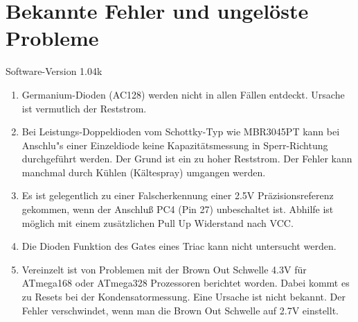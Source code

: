 
\chapter{Bekannte Fehler und ungelöste Probleme}
{\center Software-Version 1.04k}

\begin{enumerate}

\item Germanium-Dioden (AC128) werden nicht in allen Fällen entdeckt. Ursache ist vermutlich der Reststrom.
\item Bei Leistungs-Doppeldioden vom Schottky-Typ wie MBR3045PT kann bei Anschlu"s einer Einzeldiode keine Kapazitätsmessung in Sperr-Richtung 
durchgeführt werden. Der Grund ist ein zu hoher Reststrom. Der Fehler kann manchmal durch Kühlen (Kältespray) umgangen werden.
\item Es ist gelegentlich zu einer Falscherkennung einer 2.5V Präzisionsreferenz gekommen, wenn der Anschluß PC4 (Pin 27) unbeschaltet ist.
Abhilfe ist möglich mit einem zusätzlichen Pull Up Widerstand nach VCC.
\item Die Dioden Funktion des Gates eines Triac kann nicht untersucht werden.
\item Vereinzelt ist von Problemen mit der Brown Out Schwelle 4.3V für ATmega168 oder ATmega328 Prozessoren berichtet worden.
Dabei kommt es zu Resets bei der Kondensatormessung.  Eine Ursache ist nicht bekannt.
Der Fehler verschwindet, wenn man die Brown Out Schwelle auf 2.7V einstellt. 

\end{enumerate}
